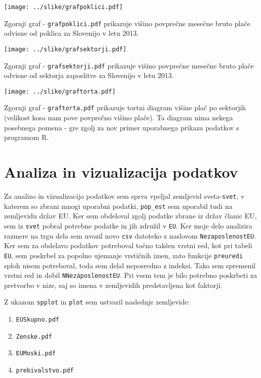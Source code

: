 \documentclass[11pt,a4paper]{article}
\begin{document}
\texttt{[image: ../slike/grafpoklici.pdf]}

Zgornji graf - \verb|grafpoklici.pdf| prikazuje višino povprečne mesečne bru\-to plače odvisne od poklica za Slovenijo v letu 2013. 

\texttt{[image: ../slike/grafsektorji.pdf]}

Zgornji graf - \verb|grafsektorji.pdf| prikazuje višino povprečne mesečne bru\-to plače odvisne od sektorja zaposlitve za Slovenijo v letu 2013. 

\texttt{[image: ../slike/graftorta.pdf]}

Zgornji graf - \verb|graftorta.pdf| prikazuje tortni diagram višine plač po sektorjih (velikost kosa nam pove povprečno višino plače). Ta diagram nima nekega posebnega pomena - gre zgolj za nov primer uporabnega prikaza podatkov s programom R. 
\pagebreak
\section{Analiza in vizualizacija podatkov}

Za analizo in vizualizacijo podatkov sem sprva vpeljal zemljevid sveta-\verb|svet|, v katerem so zbrani mnogi uporabni podatki, \verb|pop_est| sem uporabil tudi na zemljevidu držav EU. Ker sem obdeloval zgolj podatke zbrane iz držav članic EU, sem iz \verb|svet| pobral potrebne podatke in jih združil v \verb|EU|. Ker moje delo analizira razmere na trgu dela sem uvozil novo \verb|csv| datoteko z naslovom \verb|NezaposlenostEU|. Ker sem za obdelavo podatkov potreboval točno takšen vrstni red, kot pri tabeli \verb|EU|, sem poskrbel za popolno ujemanje vrstičnih imen, zato funkcije \verb|preuredi| sploh nisem potreboval, toda sem delal neposredno z indeksi. Tako sem spremenil vrstni red in dobil \verb|NNezaposlenostEU|. Pri vsem tem je bilo potrebno poskrbeti za pretvorbo v nize, saj so imena v zemljevidih predstavljena kot faktorji. 

Z ukazom \verb|spplot| in \verb|plot| sem ustvaril naslednje zemljevide: 
\begin{enumerate} 
\item{\verb|EUSkupno.pdf|}

\item{\verb|Zenske.pdf|}

\item{\verb|EUMoski.pdf|}

\item{\verb|prebivalstvo.pdf|}
\end{enumerate}
\end{document}
